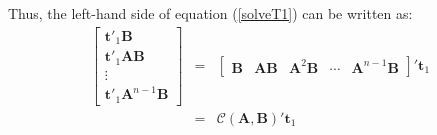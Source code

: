 \documentclass[a4paper,10pt,oneside]{book}
\begin{document}
Thus, the left-hand side of equation (\ref{solveT1}) can be written as:
\begin{eqnarray*}
 \left[ {\begin{array}{c}
 \mathbf{t}'_1\mathbf{B}\\
 \mathbf{t}'_1\mathbf{A}\mathbf{B}\\
 \vdots\\
   \mathbf{t}'_1\mathbf{A}^{n-1}\mathbf{B}\end{array} } \right]&=&\left[ {\begin{array}{ccccc} \mathbf{B}&\mathbf{AB}&\mathbf{A}^2\mathbf{B}&\cdots&\mathbf{A}^{n-1}\mathbf{B}  \end{array} } \right]'\mathbf{t}_1\\
&=&\mathcal{C}(\mathbf{A},\mathbf{B})'\mathbf{t}_1
\end{eqnarray*}
\end{document}
